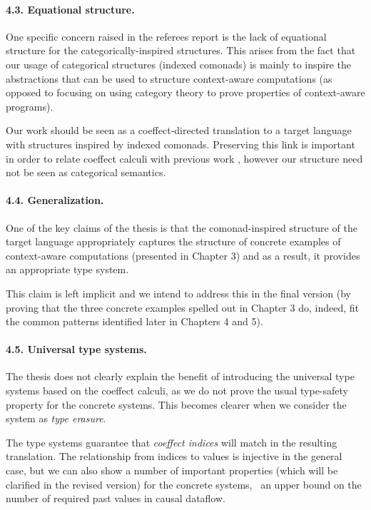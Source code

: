 \documentclass[
		twoside,openright,titlepage,numbers=noenddot,headinclude,%
                footinclude=true,cleardoublepage=empty,
                BCOR=10mm,paper=a4,fontsize=10pt, %
                ngerman,american, %
                ]{scrreprt}
\begin{document}
\vspace{-0.5em}
\paragraph{4.3. Equational structure.}

One specific concern raised in the referees report is the lack of equational structure for the
categorically-inspired structures. This arises from the fact that our usage of categorical
structures (indexed comonads) is mainly to inspire the abstractions that can be used to structure
context-aware computations (as opposed to focusing on using category theory to prove properties
of context-aware programs).

Our work should be seen as a coeffect-directed translation to a target language with structures
inspired by indexed comonads. Preserving this link is important in order to relate coeffect calculi with
previous work \cite{comonads-notions}, however our structure need not be seen as categorical
semantics.

\vspace{-0.5em}
\paragraph{4.4. Generalization.}

One of the key claims of the thesis is that the comonad-inspired structure of the target
language appropriately captures the structure of concrete examples of context-aware computations
(presented in Chapter 3) and as a result, it provides an appropriate type system.

This claim is left implicit and we intend to address this in the final version 
(by proving that the three concrete examples spelled out in Chapter 3 do, indeed, fit
the common patterns identified later in Chapters 4 and 5).

\vspace{-0.5em}
\paragraph{4.5. Universal type systems.}

The thesis does not clearly explain the benefit of introducing the universal type systems
based on the coeffect calculi, as we do not prove the usual type-safety property for the concrete systems.
This becomes clearer when we consider the system as \emph{type erasure}.

The type systems guarantee that \emph{coeffect indices} will match in the resulting 
translation. The relationship from indices to values is injective in the general case, but 
we can also show a number of important properties (which will be clarified in the revised
version) for the concrete systems, \eg~an upper bound on the number of required
past values in causal dataflow.
\end{document}
